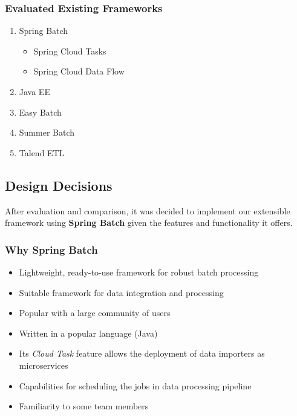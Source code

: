 \subsubsection{Evaluated Existing
Frameworks}\label{evaluated-existing-frameworks}

\begin{enumerate}
\def\labelenumi{\arabic{enumi}.}
\tightlist
\item
  Spring Batch

  \begin{itemize}
  \tightlist
  \item
    Spring Cloud Tasks
  \item
    Spring Cloud Data Flow
  \end{itemize}
\item
  Java EE
\item
  Easy Batch
\item
  Summer Batch
\item
  Talend ETL
\end{enumerate}

\subsection{Design Decisions}\label{design-decisions}

After evaluation and comparison, it was decided to implement our
extensible framework using \textbf{Spring Batch} given the features and
functionality it offers.

\subsubsection{Why Spring Batch}\label{why-spring-batch}

\begin{itemize}
\tightlist
\item
  Lightweight, ready-to-use framework for robust batch processing
\item
  Suitable framework for data integration and processing
\item
  Popular with a large community of users
\item
  Written in a popular language (Java)
\item
  Its \emph{Cloud Task} feature allows the deployment of data importers
  as microservices
\item
  Capabilities for scheduling the jobs in data processing pipeline
\item
  Familiarity to some team members
\end{itemize}

